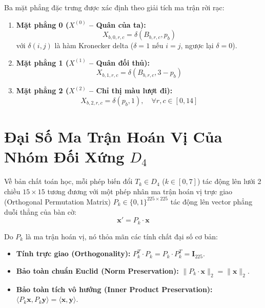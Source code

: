 \documentclass[11pt,a4paper]{report}
\begin{document}
Ba mặt phẳng đặc trưng được xác định theo giải tích ma trận rời rạc:
\begin{enumerate}
    \item \textbf{Mặt phẳng 0 ($X^{(0)}$ -- Quân của ta):}
    \begin{equation}
        X_{b, 0, r, c} = \delta(B_{b, r, c}, p_b)
    \end{equation}
    với $\delta(i, j)$ là hàm Kronecker delta ($\delta = 1$ nếu $i=j$, ngược lại $\delta = 0$).
    \item \textbf{Mặt phẳng 1 ($X^{(1)}$ -- Quân đối thủ):}
    \begin{equation}
        X_{b, 1, r, c} = \delta(B_{b, r, c}, 3 - p_b)
    \end{equation}
    \item \textbf{Mặt phẳng 2 ($X^{(2)}$ -- Chỉ thị màu lượt đi):}
    \begin{equation}
        X_{b, 2, r, c} = \delta(p_b, 1), \quad \forall r, c \in [0, 14]
    \end{equation}
\end{enumerate}

\section{Đại Số Ma Trận Hoán Vị Của Nhóm Đối Xứng $D_4$}

Về bản chất toán học, mỗi phép biến đổi $T_k \in D_4$ ($k \in [0, 7]$) tác động lên lưới 2 chiều $15 \times 15$ tương đương với một phép nhân ma trận hoán vị trực giao (Orthogonal Permutation Matrix) $P_k \in \{0, 1\}^{225 \times 225}$ tác động lên vector phẳng duỗi thẳng của bàn cờ:
\begin{equation}
    \mathbf{x}' = P_k \cdot \mathbf{x}
\end{equation}

Do $P_k$ là ma trận hoán vị, nó thỏa mãn các tính chất đại số cơ bản:
\begin{itemize}
    \item \textbf{Tính trực giao (Orthogonality):} $P_k^T \cdot P_k = P_k \cdot P_k^T = \mathbf{I}_{225}$.
    \item \textbf{Bảo toàn chuẩn Euclid (Norm Preservation):} $\|P_k \cdot \mathbf{x}\|_2 = \|\mathbf{x}\|_2$.
    \item \textbf{Bảo toàn tích vô hướng (Inner Product Preservation):} $\langle P_k \mathbf{x}, P_k \mathbf{y} \rangle = \langle \mathbf{x}, \mathbf{y} \rangle$.
\end{itemize}
\end{document}
